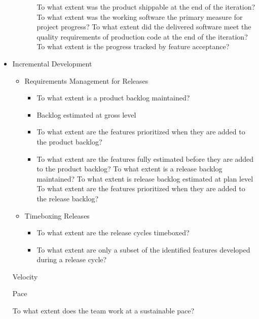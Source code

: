 \begin{itemize}
\begin{itemize}
\begin{itemize}
					\addition To what extent was the product shippable at the end of the iteration?
					\addition To what extent was the working software the primary measure for project progress?
					\addition To what extent did the delivered software meet the quality requirements of production code at the end of the iteration?
					\addition To what extent is the progress tracked by feature acceptance?
				\end{itemize}
		\end{itemize}
	\item Incremental Development
		\begin{itemize}
			\item Requirements Management for Releases
				\begin{itemize}
					\item To what extent is a product backlog maintained?
					\item Backlog estimated at gross level
					\item To what extent are the features prioritized when they are added to the product backlog?
					\item To what extent are the features fully estimated before they are added to the product backlog?
					\addition To what extent is a release backlog maintained?
					\addition To what extent is release backlog estimated at plan level 
					\addition To what extent are the features prioritized when they are added to the release backlog?
				\end{itemize}
			\item Timeboxing Releases
				\begin{itemize}
					\item To what extent are the release cycles timeboxed?
					\item To what extent are only a subset of the identified features developed during a release cycle?
				\end{itemize}
		\end{itemize}
	\strategyAddition Velocity
		\begin{itemize}
			\indicatorAddition Pace
				\begin{itemize}
					\addition To what extent does the team work at a sustainable pace?
				\end{itemize}
		\end{itemize}

\end{itemize}
